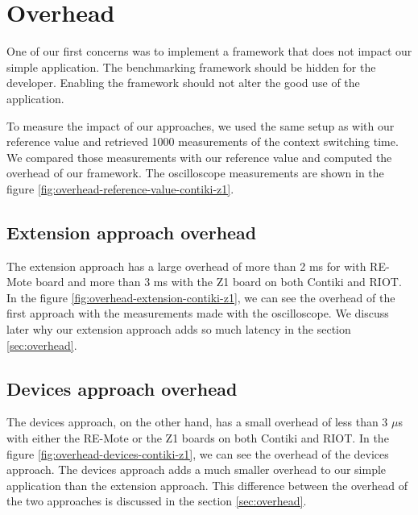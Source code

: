 \section{Overhead\label{sect:overhead}}

One of our first concerns was to implement a framework that does not impact our simple application.
The benchmarking framework should be hidden for the developer.
Enabling the framework should not alter the good use of the application.

To measure the impact of our approaches, we used the same setup as with our reference value and retrieved 1000 measurements of the context switching time.
We compared those measurements with our reference value and computed the overhead of our framework.
The oscilloscope measurements are shown in the figure \ref{fig:overhead-reference-value-contiki-z1}.

\subsection{Extension approach overhead}

The extension approach has a large overhead of more than 2 ms for with RE-Mote board and more than 3 ms with the Z1 board on both Contiki and RIOT.
In the figure \ref{fig:overhead-extension-contiki-z1}, we can see the overhead of the first approach with the measurements made with the oscilloscope.
We discuss later why our extension approach adds so much latency in the section \ref{sec:overhead}.

\subsection{Devices approach overhead}

The devices approach, on the other hand, has a small overhead of less than 3 $\mu$s with either the RE-Mote or the Z1 boards on both Contiki and RIOT.
In the figure \ref{fig:overhead-devices-contiki-z1}, we can see the overhead of the devices approach.
The devices approach adds a much smaller overhead to our simple application than the extension approach.
This difference between the overhead of the two approaches is discussed in the section \ref{sec:overhead}.

